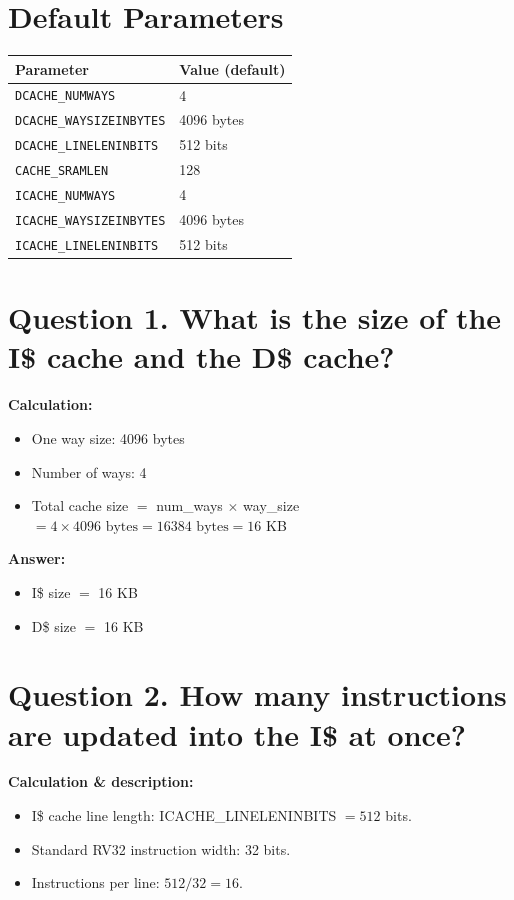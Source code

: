 \documentclass[11pt]{article}
\begin{document}
\section*{Default Parameters}

\begin{table}[h]
\centering
\begin{tabular}{ll}
\toprule
Parameter & Value (default) \\
\midrule
\texttt{DCACHE\_NUMWAYS}          & 4 \\
\texttt{DCACHE\_WAYSIZEINBYTES}   & 4096 bytes \\
\texttt{DCACHE\_LINELENINBITS}    & 512 bits \\
\texttt{CACHE\_SRAMLEN}           & 128 \\
\texttt{ICACHE\_NUMWAYS}          & 4 \\
\texttt{ICACHE\_WAYSIZEINBYTES}   & 4096 bytes \\
\texttt{ICACHE\_LINELENINBITS}    & 512 bits \\
\bottomrule
\end{tabular}
\end{table}

\section*{Question 1. What is the size of the I\$ cache and the D\$ cache?}

\textbf{Calculation:}
\begin{itemize}
  \item One way size: 4096 bytes
  \item Number of ways: 4
  \item Total cache size $=$ num\_ways $\times$ way\_size $= 4 \times 4096 \text{ bytes} = 16384 \text{ bytes} = 16$ KB
\end{itemize}

\textbf{Answer:}
\begin{itemize}
  \item I\$ size $=$ 16 KB
  \item D\$ size $=$ 16 KB
\end{itemize}

\section*{Question 2. How many instructions are updated into the I\$ at once?}

\textbf{Calculation \& description:}
\begin{itemize}
  \item I\$ cache line length: ICACHE\_LINELENINBITS $= 512$ bits.
  \item Standard RV32 instruction width: 32 bits.
  \item Instructions per line: $512 / 32 = 16$.
\end{itemize}
\end{document}
